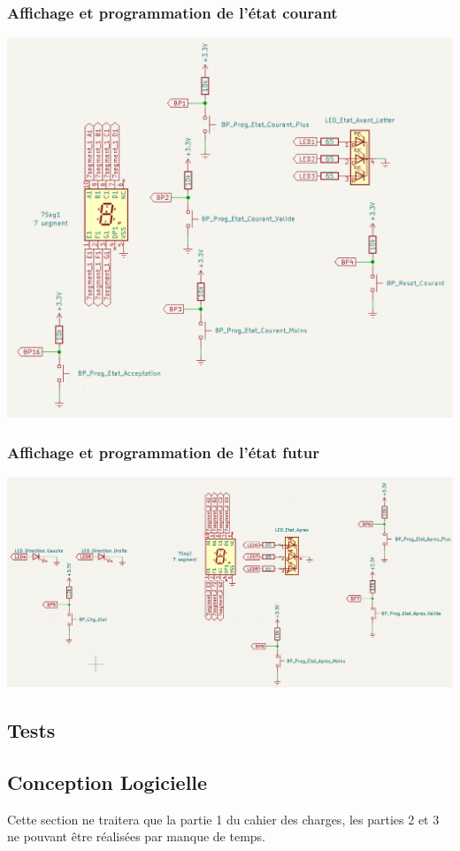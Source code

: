 \documentclass[12pt]{report}
\begin{document}
	\subsubsection{Affichage et programmation de l'état courant}
	\includegraphics[width=\textwidth]{img/st_etat_courant}
	\subsubsection{Affichage et programmation de l'état futur}
	\includegraphics[width=\textwidth]{img/st_etat_futur}
	\subsection{Tests}
	\subsection{Conception Logicielle}
	Cette section ne traitera que la partie 1 du cahier des charges, les parties 2 et 3 ne pouvant être réalisées par manque de temps.\\
\end{document}
